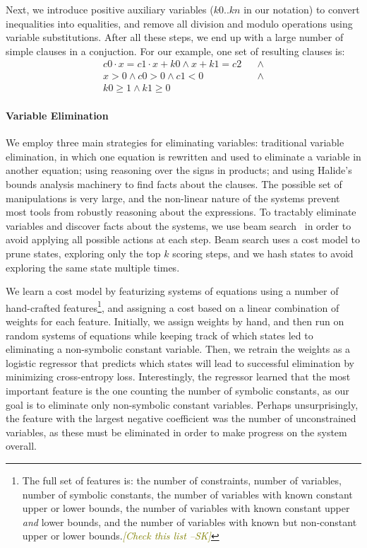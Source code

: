 \documentclass[sigplan,10pt,review,anonymous]{acmart}\settopmatter{printfolios=true,printccs=false,printacmref=false}
\newcommand{\sak}[1]{\textcolor{olive}{\textit{[{#1} --SK]}}}
\begin{document}
Next, we introduce positive auxiliary variables ($k0..kn$ in our notation) to convert
inequalities into equalities, and remove all division and modulo operations using
variable substitutions.  After all these steps, we end up with a large number of simple
clauses in a conjuction.  For our example, one set of resulting clauses is:
\begin{align*}
c0 \cdot x = c1 \cdot x + k0  \wedge x + k1 = c2 & & \wedge \\
x > 0 \wedge
c0 > 0 \wedge 
c1 < 0 & & \wedge  \\
k0 \geq 1 \wedge k1 \geq 0 & &
\end{align*}

\paragraph{Variable Elimination} We employ three main strategies for eliminating
variables: traditional variable elimination, in which one equation is rewritten and
used to eliminate a variable in another equation; using reasoning over the signs in products;
and using Halide's bounds analysis machinery to find facts about the clauses.  The possible
set of manipulations is very large, and the non-linear nature of the systems prevent most
tools from robustly reasoning about the expressions.  To tractably eliminate variables and discover
facts about the systems, we use beam search~\cite{beamsearch} in order to avoid applying
all possible actions at each step.  Beam search uses a cost model to prune states, exploring
only the top $k$ scoring steps, and we hash states to avoid exploring the same state multiple
times.

We learn a cost model by featurizing systems of equations using a number of hand-crafted
features\footnote{The full set of features is: the number of constraints, number of variables,
  number of symbolic constants, the number of variables with known constant upper or lower bounds,
  the number of variables with known constant upper \textit{and} lower bounds, and the number of
  variables with known but non-constant upper or lower bounds.\sak{Check this list}},
and assigning a cost based on a linear combination of weights for each feature.  Initially,
we assign weights by hand, and then run on random systems of equations while keeping track
of which states led to eliminating a non-symbolic constant variable.  Then, we retrain the weights
as a logistic regressor that predicts which states will lead to successful elimination
by minimizing cross-entropy loss.  Interestingly, the regressor learned that the most
important feature is the one counting the number of symbolic constants, as our goal
is to eliminate only non-symbolic constant variables.  Perhaps unsurprisingly, the feature
with the largest negative coefficient was the number of unconstrained variables, as
these must be eliminated in order to make progress on the system overall.
\end{document}
